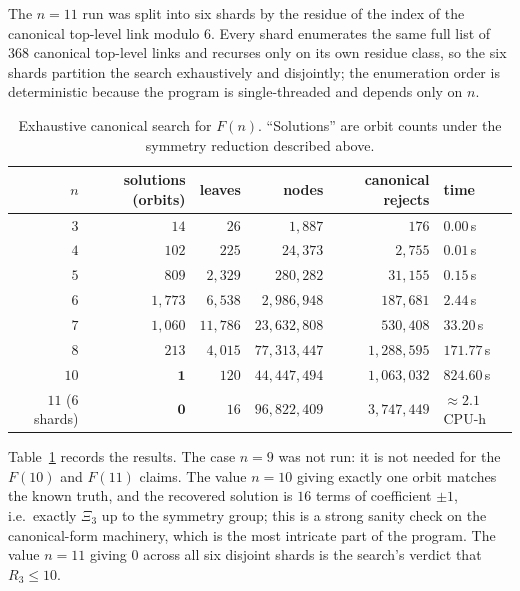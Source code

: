 \documentclass[11pt,reqno]{amsart}
\theoremstyle{plain}
\theoremstyle{definition}
\numberwithin{theorem}{section}
\newcommand{\XiC}{\Xi}
\begin{document}
The $n = 11$ run was split into six shards by the residue of the index of the canonical
top-level link modulo $6$. Every shard enumerates the same full list of $368$ canonical
top-level links and recurses only on its own residue class, so the six shards partition the
search exhaustively and disjointly; the enumeration order is deterministic because the program
is single-threaded and depends only on $n$.

\begin{table}[ht]
\caption{Exhaustive canonical search for $F(n)$. ``Solutions'' are orbit counts under the
symmetry reduction described above.}\label{tab:search}
\centering
\begin{tabular}{rrrrrl}
\toprule
$n$ & solutions (orbits) & leaves & nodes & canonical rejects & time \\
\midrule
$3$  & $14$   & $26$     & $1{,}887$      & $176$        & $0.00$\,s \\
$4$  & $102$  & $225$    & $24{,}373$     & $2{,}755$    & $0.01$\,s \\
$5$  & $809$  & $2{,}329$ & $280{,}282$   & $31{,}155$   & $0.15$\,s \\
$6$  & $1{,}773$ & $6{,}538$ & $2{,}986{,}948$ & $187{,}681$ & $2.44$\,s \\
$7$  & $1{,}060$ & $11{,}786$ & $23{,}632{,}808$ & $530{,}408$ & $33.20$\,s \\
$8$  & $213$  & $4{,}015$ & $77{,}313{,}447$ & $1{,}288{,}595$ & $171.77$\,s \\
$10$ & $\mathbf{1}$ & $120$ & $44{,}447{,}494$ & $1{,}063{,}032$ & $824.60$\,s \\
$11$ (6 shards) & $\mathbf{0}$ & $16$ & $96{,}822{,}409$ & $3{,}747{,}449$ & $\approx 2.1$\,CPU-h \\
\bottomrule
\end{tabular}
\end{table}

Table~\ref{tab:search} records the results. The case $n = 9$ was not run: it is not needed for
the $F(10)$ and $F(11)$ claims. The value $n = 10$ giving exactly one orbit matches the known
truth, and the recovered solution is $16$ terms of coefficient $\pm1$, i.e.\ exactly $\XiC_3$ up
to the symmetry group; this is a strong sanity check on the canonical-form machinery, which is
the most intricate part of the program. The value $n = 11$ giving $0$ across all six disjoint
shards is the search's verdict that $R_3 \le 10$.
\end{document}
